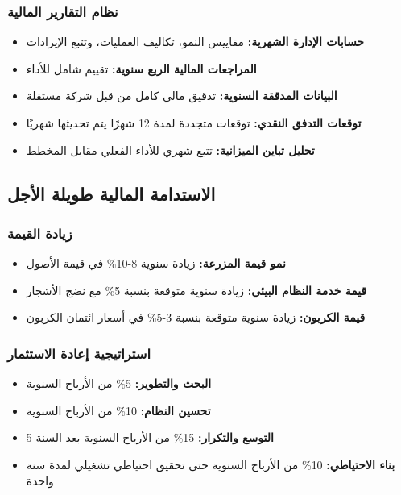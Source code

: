 \subsubsection{نظام التقارير المالية}
\begin{itemize}
    \item \textbf{حسابات الإدارة الشهرية:} مقاييس النمو، تكاليف العمليات، وتتبع الإيرادات
    \item \textbf{المراجعات المالية الربع سنوية:} تقييم شامل للأداء
    \item \textbf{البيانات المدققة السنوية:} تدقيق مالي كامل من قبل شركة مستقلة
    \item \textbf{توقعات التدفق النقدي:} توقعات متجددة لمدة 12 شهرًا يتم تحديثها شهريًا
    \item \textbf{تحليل تباين الميزانية:} تتبع شهري للأداء الفعلي مقابل المخطط
\end{itemize}

\subsection{الاستدامة المالية طويلة الأجل}

\subsubsection{زيادة القيمة}
\begin{itemize}
    \item \textbf{نمو قيمة المزرعة:} زيادة سنوية 8-10\% في قيمة الأصول
    \item \textbf{قيمة خدمة النظام البيئي:} زيادة سنوية متوقعة بنسبة 5\% مع نضج الأشجار
    \item \textbf{قيمة الكربون:} زيادة سنوية متوقعة بنسبة 3-5\% في أسعار ائتمان الكربون
\end{itemize}

\subsubsection{استراتيجية إعادة الاستثمار}
\begin{itemize}
    \item \textbf{البحث والتطوير:} 5\% من الأرباح السنوية
    \item \textbf{تحسين النظام:} 10\% من الأرباح السنوية
    \item \textbf{التوسع والتكرار:} 15\% من الأرباح السنوية بعد السنة 5
    \item \textbf{بناء الاحتياطي:} 10\% من الأرباح السنوية حتى تحقيق احتياطي تشغيلي لمدة سنة واحدة
\end{itemize}
